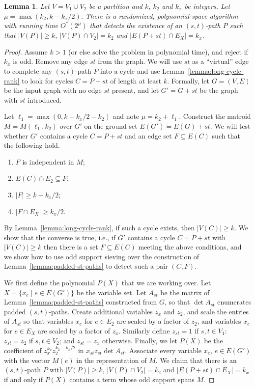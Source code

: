 \documentclass[10pt,a4paper]{article}
\newtheorem{lemma}{Lemma}[section]
\begin{document}
\begin{lemma} \label{lemma:alg-longcycle}
  Let $V=V_1 \cup V_2$ be a partition and $k$, $k_2$ and $k_x$ be integers. 
  Let $\mu=\max(k_2, k-k_x/2)$. There is a randomized, polynomial-space
  algorithm with running time $O^*(2^\mu)$ that detects the existence
  of an $(s,t)$-path $P$ such that $|V(P)| \geq k$, $|V(P) \cap V_2|=k_2$
  and $|E(P+st) \cap E_X|=k_x$.
\end{lemma}
\begin{proof}
  Assume $k>1$ (or else solve the problem in polynomial time),
  and reject if $k_x$ is odd. Remove any edge $st$ from the graph.
  We will use $st$ as a ``virtual'' edge to complete any
  $(s,t)$-path $P$ into a cycle and use Lemma~\ref{lemma:long-cycle-rank} 
  to look for cycles $C=P+st$ of length at least $k$.
  Formally, let $G=(V,E)$ be the input graph with no edge $st$
  present, and let $G'=G+st$ be the graph with $st$ introduced. 
  
  Let $\ell_1=\max(0, k-k_x/2-k_2)$ and note $\mu=k_2+\ell_1$. 
  Construct the matroid $M=M(\ell_1,k_2)$ over $G'$ on the ground set
  $E(G')=E(G)+st$. We will test whether $G'$ contains a cycle $C=P+st$
  and an edge set $F \subseteq E(C)$ such that the following hold.
  \begin{enumerate}
  \item $F$ is independent in $M$;
  \item $E(C) \cap E_2 \subseteq F$;
  \item $|F| \geq k-k_x/2$;
  \item $|F \cap E_X| \geq k_x/2$.
  \end{enumerate}
  By Lemma~\ref{lemma:long-cycle-rank}, if such a cycle exists, then
  $|V(C)| \geq k$. We show that the converse is true, i.e., if $G'$
  contains a cycle $C=P+st$ with $|V(C)| \geq k$ then there is a set
  $F \subseteq E(C)$ meeting the above conditions, and we show how to 
  use odd support sieving over the construction of
  Lemma~\ref{lemma:padded-st-paths} to detect such a pair $(C,F)$. 

  We first define the polynomial $P(X)$ that we are working over.
  Let $X=\{x_e \mid e \in E(G')\}$ be the variable set.
  Let $A_{st}$ be the matrix of Lemma~\ref{lemma:padded-st-paths}
  constructed from $G$, so that $\det A_{st}$ enumerates padded $(s,t)$-paths.
  Create additional variables $z_x$ and $z_2$, and scale the entries
  of $A_{st}$ so that variables $x_e$ for $e \in E_2$ are scaled by a factor of $z_2$,
  and variables $x_e$ for $e \in E_X$ are scaled by a factor of $z_x$.
  Similarly define $z_{st}=1$ if $s, t \in V_1$:
  $z_{st}=z_2$ if $s, t \in V_2$; and $z_{st}=z_x$ otherwise.
  Finally, we let $P(X)$ be the coefficient of $z_x^{k_x} z_2^{k_2-k_x/2}$ 
  in $x_{st}z_{st} \det A_{st}$. Associate every variable $x_e$,
  $e \in E(G')$ with the vector $M(e)$ in the representation of $M$.
  We claim that there is an $(s,t)$-path $P$ with $|V(P)| \geq k$,
  $|V(P) \cap V_2|=k_2$ and $|E(P+st) \cap E_X|=k_x$
  if and only if $P(X)$ contains a term whose odd support spans $M$.


\end{proof}
\end{document}
